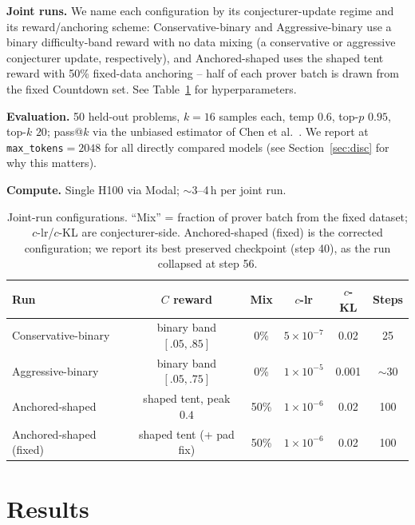 \documentclass{article}
\begin{document}
\noindent\textbf{Joint runs.} We name each configuration by its
conjecturer-update regime and its reward/anchoring scheme: Conservative-binary
and Aggressive-binary use a binary difficulty-band reward with no data mixing (a
conservative or aggressive conjecturer update, respectively), and Anchored-shaped
uses the shaped tent reward with 50\% fixed-data anchoring -- half of each prover
batch is drawn from the fixed Countdown set. See Table~\ref{tab:configs} for
hyperparameters.

\noindent\textbf{Evaluation.} 50 held-out problems, $k{=}16$ samples each, temp
$0.6$, top-$p$ $0.95$, top-$k$ $20$; pass@$k$ via the unbiased estimator of
Chen et al.~\cite{chen2021codex}. We report at \texttt{max\_tokens}${=}2048$ for
all directly compared models (see Section~\ref{sec:disc} for why this matters).

\noindent\textbf{Compute.} Single H100 via Modal; $\sim$3--4\,h per joint run.

\begin{table}[h]
\centering\small
\caption{Joint-run configurations. ``Mix'' = fraction of prover batch from the
fixed dataset; $c$-lr/$c$-KL are conjecturer-side. Anchored-shaped (fixed) is the corrected
configuration; we report its best preserved checkpoint (step 40), as the run collapsed at step 56.}
\label{tab:configs}
\begin{tabular}{lccccc}
\toprule
Run & $C$ reward & Mix & $c$-lr & $c$-KL & Steps \\
\midrule
Conservative-binary & binary band $[.05,.85]$ & 0\% & $5\!\times\!10^{-7}$ & 0.02 & 25 \\
Aggressive-binary & binary band $[.05,.75]$ & 0\% & $1\!\times\!10^{-5}$ & 0.001 & $\sim$30 \\
Anchored-shaped & shaped tent, peak $0.4$ & 50\% & $1\!\times\!10^{-6}$ & 0.02 & 100 \\
Anchored-shaped (fixed) & shaped tent (+ pad fix) & 50\% & $1\!\times\!10^{-6}$ & 0.02 & 100 \\
\bottomrule
\end{tabular}
\end{table}

\section{Results}
\label{sec:results}
\end{document}
